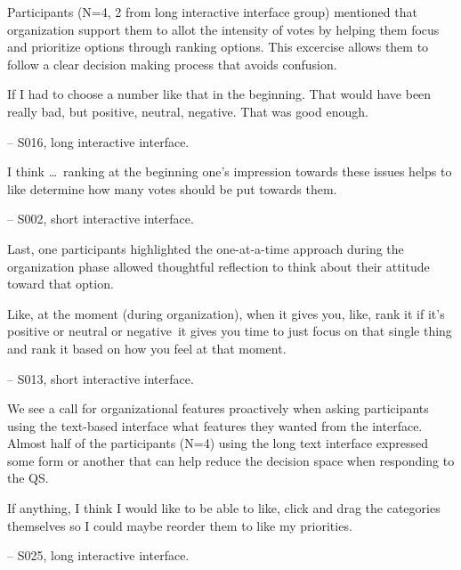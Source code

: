 
Participants (N=4, 2 from long interactive interface group) mentioned that organization support them to allot the intensity of votes by helping them focus and prioritize options through ranking options. This excercise allows them to follow a clear decision making process that avoids confusion.

\begin{displayquote}
If I had to choose a number like that in the beginning. That would have been really bad, but positive, neutral, negative. That was good enough.

\noindent \hfill -- S016, long interactive interface.
\end{displayquote}

\begin{displayquote}
I think \ldots\ ranking at the beginning one's impression towards these issues helps to like determine how many votes should be put towards them. 

\noindent \hfill -- S002, short interactive interface.
\end{displayquote}

Last, one participants highlighted the one-at-a-time approach during the organization phase allowed thoughtful reflection to think about their attitude toward that option.

\begin{displayquote}
Like, at the moment (during organization), when it gives you, like, rank it if it's positive or neutral or negative~\bracketellipsis it gives you time to just focus on that single thing and rank it based on how you feel at that moment.
    
    \noindent \hfill -- S013, short interactive interface.
\end{displayquote}

We see a call for organizational features proactively when asking participants using the text-based interface what features they wanted from the interface. Almost half of the participants (N=4) using the long text interface expressed some form or another that can help reduce the decision space when responding to the QS.

\begin{displayquote}
    If anything, I think I would like to be able to like, click and drag the categories themselves so I could maybe reorder them to like my priorities.
        
        \noindent \hfill -- S025, long interactive interface.
\end{displayquote}

